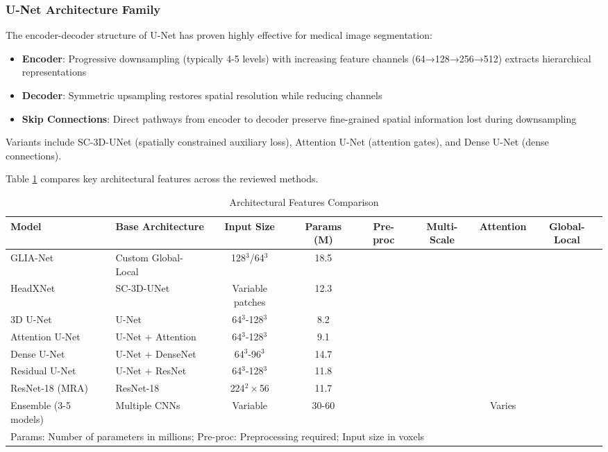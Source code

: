 \documentclass[conference]{IEEEtran}
\newcommand{\cmark}{\ding{51}}
\newcommand{\xmark}{\ding{55}}
\begin{document}
\subsubsection{U-Net Architecture Family}
The encoder-decoder structure of U-Net has proven highly effective for medical image segmentation:
\begin{itemize}
    \item \textbf{Encoder}: Progressive downsampling (typically 4-5 levels) with increasing feature channels (64→128→256→512) extracts hierarchical representations
    \item \textbf{Decoder}: Symmetric upsampling restores spatial resolution while reducing channels
    \item \textbf{Skip Connections}: Direct pathways from encoder to decoder preserve fine-grained spatial information lost during downsampling
\end{itemize}

Variants include SC-3D-UNet (spatially constrained auxiliary loss), Attention U-Net (attention gates), and Dense U-Net (dense connections).

Table \ref{tab:architecture} compares key architectural features across the reviewed methods.

\begin{table}[htbp]
\caption{Architectural Features Comparison}
\begin{center}
\scriptsize
\begin{tabular}{|l|l|c|c|c|c|c|c|}
\hline
\textbf{Model} & \textbf{Base Architecture} & \textbf{Input Size} & \textbf{Params (M)} & \textbf{Pre-proc} & \textbf{Multi-Scale} & \textbf{Attention} & \textbf{Global-Local} \\
\hline
\hline
GLIA-Net & Custom Global-Local & 128$^3$/64$^3$ & 18.5 & \xmark & \cmark & \cmark & \cmark \\
\hline
HeadXNet & SC-3D-UNet & Variable patches & 12.3 & \cmark & \cmark & \xmark & \xmark \\
\hline
3D U-Net & U-Net & 64$^3$-128$^3$ & 8.2 & \cmark & \cmark & \xmark & \xmark \\
\hline
Attention U-Net & U-Net + Attention & 64$^3$-128$^3$ & 9.1 & \cmark & \cmark & \cmark & \xmark \\
\hline
Dense U-Net & U-Net + DenseNet & 64$^3$-96$^3$ & 14.7 & \cmark & \cmark & \xmark & \xmark \\
\hline
Residual U-Net & U-Net + ResNet & 64$^3$-128$^3$ & 11.8 & \cmark & \cmark & \xmark & \xmark \\
\hline
ResNet-18 (MRA) & ResNet-18 & 224$^2 \times$56 & 11.7 & \cmark & \cmark & \xmark & \xmark \\
\hline
Ensemble (3-5 models) & Multiple CNNs & Variable & 30-60 & \cmark & \cmark & Varies & \xmark \\
\hline
\multicolumn{8}{l}{\footnotesize Params: Number of parameters in millions; Pre-proc: Preprocessing required; Input size in voxels}\\
\end{tabular}
\label{tab:architecture}
\end{center}
\end{table}
\end{document}
